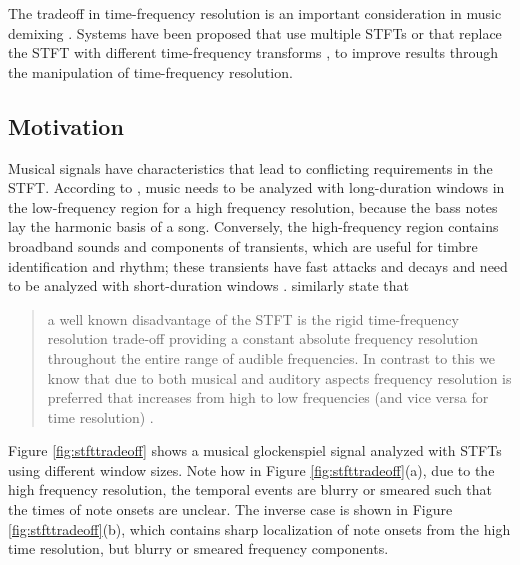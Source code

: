 \documentclass[report.tex]{subfiles}
\begin{document}
The tradeoff in time-frequency resolution is an important consideration in music demixing \parencite{tftradeoff1, tftradeoff2}. Systems have been proposed that use multiple STFTs \parencite{fitzgerald2, driedger} or that replace the STFT with different time-frequency transforms \parencite{fitzgerald2, cqtseparation, bettermusicsep}, to improve results through the manipulation of time-frequency resolution.

\subsection{Motivation}
\label{sec:motivation}

Musical signals have characteristics that lead to conflicting requirements in the STFT. According to \textcite{doerflerphd}, music needs to be analyzed with long-duration windows in the low-frequency region for a high frequency resolution, because the bass notes lay the harmonic basis of a song. Conversely, the high-frequency region contains broadband sounds and components of transients, which are useful for timbre identification and rhythm; these transients have fast attacks and decays and need to be analyzed with short-duration windows \parencite{doerflerphd}. \citeauthor{cqtransient} similarly state that

\begin{quote}
	a well known disadvantage of the STFT is the rigid time-frequency resolution trade-off providing a constant absolute frequency resolution throughout the entire range of audible frequencies. In contrast to this we know that due to both musical and auditory aspects frequency resolution is preferred that increases from high to low frequencies (and vice versa for time resolution) \parencite[1]{cqtransient}.
\end{quote}

Figure \ref{fig:stfttradeoff} shows a musical glockenspiel signal analyzed with STFTs using different window sizes. Note how in Figure \ref{fig:stfttradeoff}(a), due to the high frequency resolution, the temporal events are blurry or smeared such that the times of note onsets are unclear. The inverse case is shown in Figure \ref{fig:stfttradeoff}(b), which contains sharp localization of note onsets from the high time resolution, but blurry or smeared frequency components.
\end{document}

